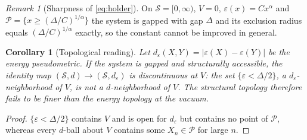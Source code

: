 \documentclass[11pt,a4paper]{article}
\newtheorem{corollary}{Corollary}
\theoremstyle{definition}
\theoremstyle{remark}
\newtheorem{remark}{Remark}
\newcommand{\Pset}{\mathcal{P}}
\begin{document}
\begin{remark}[Sharpness of \eqref{eq:holder}]
On $\mathcal S=[0,\infty)$, $V=0$, $\varepsilon(x)=Cx^\alpha$ and $\Pset=\{x\ge(\Delta/C)^{1/\alpha}\}$ the system is gapped with gap $\Delta$ and its exclusion radius equals $(\Delta/C)^{1/\alpha}$ exactly, so the constant cannot be improved in general.
\end{remark}

\begin{corollary}[Topological reading]\label{cor:top}
Let $d_\varepsilon(X,Y)=|\varepsilon(X)-\varepsilon(Y)|$ be the energy pseudometric. If the system is gapped and structurally accessible, the identity map $(\mathcal S,d)\to(\mathcal S,d_\varepsilon)$ is discontinuous at $V$: the set $\{\varepsilon<\Delta/2\}$, a $d_\varepsilon$-neighborhood of $V$, is not a $d$-neighborhood of $V$. The structural topology therefore fails to be finer than the energy topology at the vacuum.
\end{corollary}
\begin{proof}
$\{\varepsilon<\Delta/2\}$ contains $V$ and is open for $d_\varepsilon$ but contains no point of $\Pset$, whereas every $d$-ball about $V$ contains some $X_n\in\Pset$ for large $n$.
\end{proof}
\end{document}
